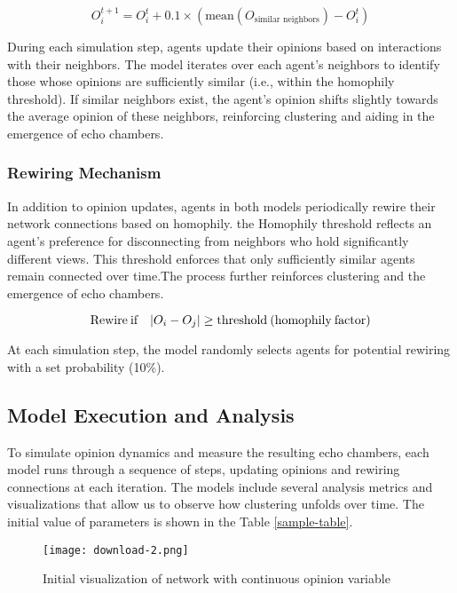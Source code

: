 \documentclass{article} %
\begin{document}
\begin{equation}
 O_{i}^{t+1} = O_{i}^{t} + 0.1 \times (\text{mean}(O_{\text{similar neighbors}}) - O_{i}^{t})
\end{equation}

During each simulation step, agents update their opinions based on interactions with their neighbors. The model iterates over each agent’s neighbors to identify those whose opinions are sufficiently similar (i.e., within the homophily threshold). If similar neighbors exist, the agent’s opinion shifts slightly towards the average opinion of these neighbors, reinforcing clustering and aiding in the emergence of echo chambers.

\subsubsection{Rewiring Mechanism}
In addition to opinion updates, agents in both models periodically rewire their network connections based on homophily. 
the Homophily threshold reflects an agent’s preference for disconnecting from neighbors who hold significantly different views. This threshold enforces that only sufficiently similar agents remain connected over time.The process further reinforces clustering and the emergence of echo chambers.

\begin{equation}
\text{Rewire\:if}\quad |O_i - O_j| \geq \text{threshold\:(homophily\:factor)}
\end{equation}

At each simulation step, the model randomly selects agents for potential rewiring with a set probability (10\%). 

\subsection{Model Execution and Analysis}
To simulate opinion dynamics and measure the resulting echo chambers, each model runs through a sequence of steps, updating opinions and rewiring connections at each iteration. The models include several analysis metrics and visualizations that allow us to observe how clustering unfolds over time. The initial value of parameters is shown in the Table \ref{sample-table}.

\begin{figure}[h]
    \centering
    \texttt{[image: download-2.png]}
    \caption{Initial visualization of network with continuous opinion variable}
    \label{fig:c1}
\end{figure}
\end{document}
